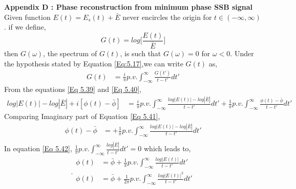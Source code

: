 \\
\\
\textbf{Appendix D : Phase reconstruction from minimum phase SSB signal}\\
Given function $E(t)=E_{s}(t)+\bar{E}$ never encircles the origin for $t\in(-\infty,\infty)$. if we define,
\begin{equation}
G(t)=log\bigg[\dfrac{E(t)}{\bar{E}}\bigg]
\label{Eq 5.39}
\end{equation} 
then $G(\omega)$, the spectrum of $G(t)$, is such that $G(\omega)=0$ for $\omega<0$. Under the hypothesis stated by Equation \ref{Eq:5.17},we can write $G(t)$ as,
\begin{equation}
\begin{split}
G(t) &=\frac{i}{\pi} p.v. \int_{-\infty}^{\infty} \frac{G(t')}{t-t'} dt' 
\end{split}
\label{Eq 5.40}
\end{equation}
From the equations \ref{Eq 5.39} and \ref{Eq 5.40},
\begin{equation}
\begin{split}
log|E(t)|-log|\bar{E}|+i[\phi(t)-\bar{\phi}] &=\frac{i}{\pi} p.v. \int_{-\infty}^{\infty} \frac{log|E(t)|-log|\bar{E}|}{t-t'} dt' + \frac{1}{\pi} p.v. \int_{-\infty}^{\infty} \frac{\phi(t)-\bar{\phi}}{t-t'} dt' 
\end{split}
\label{Eq 5.41}
\end{equation}
Comparing Imaginary part of Equation \ref{Eq 5.41},
\begin{equation}
\begin{split}
\phi(t)-\bar{\phi} &= + \frac{1}{\pi} p.v. \int_{-\infty}^{\infty} \frac{log|E(t)|-log|\bar{E}|}{t-t'} dt'\\
\end{split}
\label{Eq 5.42}
\end{equation}
In equation \ref{Eq 5.42}, $\frac{1}{\pi} p.v. \int_{-\infty}^{\infty} \frac{log|\bar{E}|}{t-t'} dt'=0$ which leads to,
\begin{equation}.
\begin{split}
\phi(t) &= \bar{\phi} + \frac{1}{\pi} p.v. \int_{-\infty}^{\infty} \frac{log|E(t)|}{t-t'} dt'\\
\phi(t) &= \bar{\phi} + \frac{1}{2\pi} p.v. \int_{-\infty}^{\infty} \frac{log|E(t)|^2}{t-t'} dt'\\
\end{split}
\label{Eq 5.43}
\end{equation}
